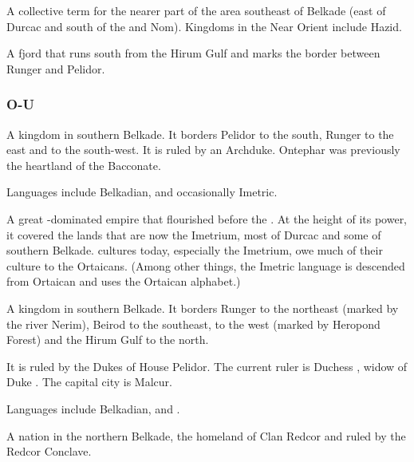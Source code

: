 A collective term for the nearer part of the area southeast of Belkade (east of Durcac and south of the \Serplands{} and Nom). Kingdoms in the Near Orient include Hazid. 



A fjord that runs south from the Hirum Gulf and marks the border between Runger and Pelidor. 



\subsubsection{O-U}

A kingdom in southern Belkade. It borders Pelidor to the south, Runger to the east and \Scyrum{} to the south-west. It is ruled by an Archduke. Ontephar was previously the heartland of the \Tepharin{} Bacconate. 

Languages include Belkadian, \Tepharin{} and occasionally Imetric. 



A great \scatha{}-dominated empire that flourished before the \darkfall{}. At the height of its power, it covered the lands that are now the Imetrium, most of Durcac and some of southern Belkade. \Scathaese{} cultures today, especially the Imetrium, owe much of their culture to the Ortaicans. (Among other things, the Imetric language is descended from Ortaican and uses the Ortaican alphabet.) 




A kingdom in southern Belkade. It borders Runger to the northeast (marked by the river Nerim), Beirod to the southeast, \Scyrum{} to the west (marked by Heropond Forest) and the Hirum Gulf to the north. 

It is ruled by the Dukes of House Pelidor. The current ruler is Duchess \Iakis, widow of Duke \Icor. The capital city is Malcur. 

Languages include Belkadian, \Tepharin{} and \Ortic. 



\gitem{\Redce{}}
A nation in the northern Belkade, the homeland of Clan Redcor and ruled by the Redcor Conclave. 

